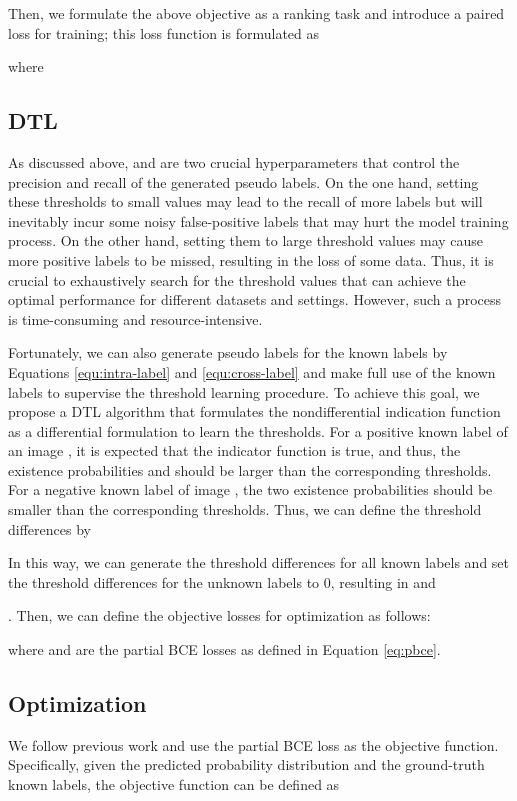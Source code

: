 Then, we formulate the above objective as a ranking task and introduce a paired loss for training; this loss function is formulated as

where


\subsection{DTL}
\label{sec:dtl}
As discussed above,  and  are two crucial hyperparameters that control the precision and recall of the generated pseudo labels. On the one hand, setting these thresholds to small values may lead to the recall of more labels but will inevitably incur some noisy false-positive labels that may hurt the model training process. On the other hand, setting them to large threshold values may cause more positive labels to be missed, resulting in the loss of some data. Thus, it is crucial to exhaustively search for the threshold values that can achieve the optimal performance for different datasets and settings. However, such a process is time-consuming and resource-intensive.

Fortunately, we can also generate pseudo labels for the known labels by Equations \ref{equ:intra-label} and \ref{equ:cross-label} and make full use of the known labels to supervise the threshold learning procedure. To achieve this goal, we propose a DTL algorithm that formulates the nondifferential indication function as a differential formulation to learn the thresholds. For a positive known label  of an image , it is expected that the indicator function is true, and thus, the existence probabilities  and  should be larger than the corresponding thresholds. For a negative known label  of image , the two existence probabilities should be smaller than the corresponding thresholds. Thus, we can define the threshold differences by

In this way, we can generate the threshold differences for all known labels and set the threshold differences for the unknown labels to 0, resulting in  and 

. Then, we can define the objective losses for optimization as follows:

where  and  are the partial BCE losses as defined in Equation \ref{eq:pbce}.

\subsection{Optimization}
We follow previous work and use the partial BCE loss as the objective function. Specifically, given the predicted probability distribution  and the ground-truth known labels, the objective function can be defined as

